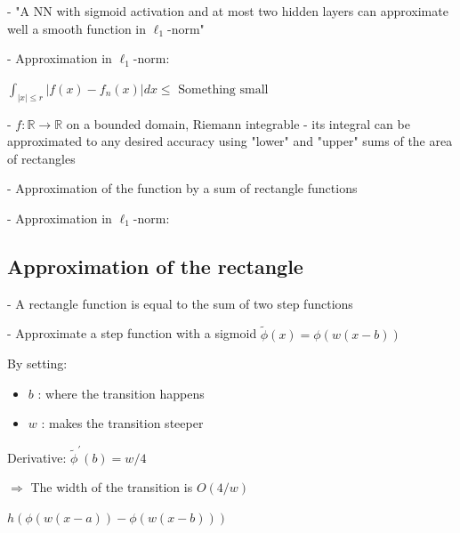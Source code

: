 - "A NN with sigmoid activation and at most two hidden layers can approximate well a smooth function in $\ell_{1}$-norm"

- Approximation in $\ell_{1}$-norm:

$
\int_{|x| \leq r}\left|f(x)-f_{n}(x)\right| d x \leq \text { Something small }
$


- $f: \mathbb{R} \rightarrow \mathbb{R}$ on a bounded domain, Riemann integrable - its integral can be approximated to any desired accuracy using "lower" and "upper" sums of the area of rectangles

- Approximation of the function by a sum of rectangle functions

- Approximation in $\ell_{1}$-norm:



\subsection*{Approximation of the rectangle}


- A rectangle function is equal to the sum of two step functions

- Approximate a step function with a sigmoid
$
\tilde{\phi}(x)=\phi(w(x-b))
$

By setting:

\begin{itemize}
  \item $b$ : where the transition happens
  \item $w$ : makes the transition steeper
\end{itemize}

Derivative: $\tilde{\phi}^{\prime}(b)=w / 4$

$\Rightarrow$ The width of the transition is $O(4 / w)$

$
h(\phi(w(x-a))-\phi(w(x-b)))
$


